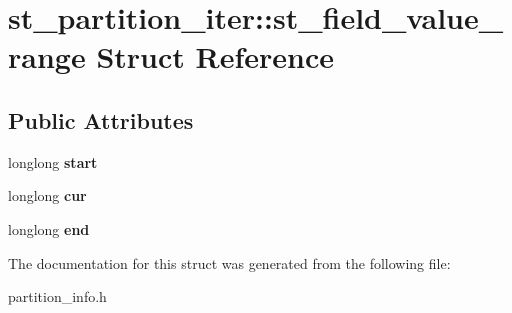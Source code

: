 \hypertarget{structst__partition__iter_1_1st__field__value__range}{}\section{st\+\_\+partition\+\_\+iter\+:\+:st\+\_\+field\+\_\+value\+\_\+range Struct Reference}
\label{structst__partition__iter_1_1st__field__value__range}
\subsection*{Public Attributes}
\begin{DoxyCompactItemize}
\item 
\mbox{\label{structst__partition__iter_1_1st__field__value__range_a8ff06a2eda44050a533e57b8c15c564f}} 
longlong {\bfseries start}
\item 
\mbox{\label{structst__partition__iter_1_1st__field__value__range_a485d9929b1828f410f189119dbd9a2fc}} 
longlong {\bfseries cur}
\item 
\mbox{\label{structst__partition__iter_1_1st__field__value__range_aa8c59e6903d7e8d6879924fde932ef98}} 
longlong {\bfseries end}
\end{DoxyCompactItemize}


The documentation for this struct was generated from the following file\+:\begin{DoxyCompactItemize}
\item 
partition\+\_\+info.\+h\end{DoxyCompactItemize}
